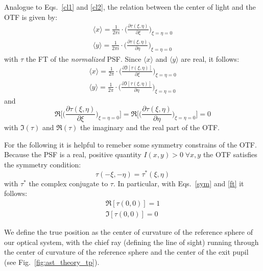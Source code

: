 Analogue to Eqs.~\ref{cl1} and \ref{cl2}, the relation between the center of light and the OTF is given by:
\begin{eqnarray}
\langle x \rangle = \frac{1}{2\pi i} \cdot \Big(\frac{\partial \tau(\xi, \eta)}{\partial \xi}\Big)_{\xi = \eta = 0} \\
\langle y \rangle = \frac{1}{2\pi i} \cdot \Big(\frac{\partial \tau(\xi, \eta)}{\partial \eta}\Big)_{\xi = \eta = 0}
\end{eqnarray}
with $\tau$ the FT of the {\it normalized} PSF. Since $\langle x \rangle$ and $\langle y \rangle$ are real, it follows:
\begin{eqnarray}
\langle x \rangle = \frac{1}{2\pi} \cdot \Big(\frac{\partial \Im[\tau(\xi, \eta)]}{\partial \xi}\Big)_{\xi = \eta = 0} \\
\langle y \rangle = \frac{1}{2\pi} \cdot \Big(\frac{\partial \Im[\tau(\xi, \eta)]}{\partial \eta}\Big)_{\xi = \eta = 0}
\end{eqnarray}
and
\begin{equation}\label{con1}
\Re\Bigg[\Big(\frac{\partial \tau(\xi, \eta)}{\partial \xi}\Big)_{\xi = \eta = 0}\Bigg] = \Re\Bigg[\Big(\frac{\partial \tau(\xi, \eta)}{\partial \eta}\Big)_{\xi = \eta = 0}\Bigg] = 0
\end{equation}
with $\Im(\tau)$ and $\Re(\tau)$ the imaginary and the real part of the OTF.

For the following it is helpful to remeber some symmetry constrains of the OTF.
Because the PSF is a real, positive quantity $I(x,y) > 0 \; \forall x,y$ the OTF satisfies the symmetry condition:
\begin{equation}\label{sym}
\tau(-\xi, -\eta) = \tau^{\ast}(\xi,\eta)
\end{equation}
with $\tau^{\ast}$ the complex conjugate to $\tau$. In particular, with Eqs.~\ref{sym} and \ref{ft} it follows:
\begin{eqnarray}
\Re[\tau(0,0)] = 1 \\
\Im[\tau(0,0)] = 0 \label{con2}
\end{eqnarray}

We define the true position as the center of curvature of the reference sphere of our optical system, with the chief ray (defining the line of sight) running through the center of curvature of the reference sphere and the center of the exit pupil (see Fig.~\ref{fig:ast_theory_tp}).

  
  